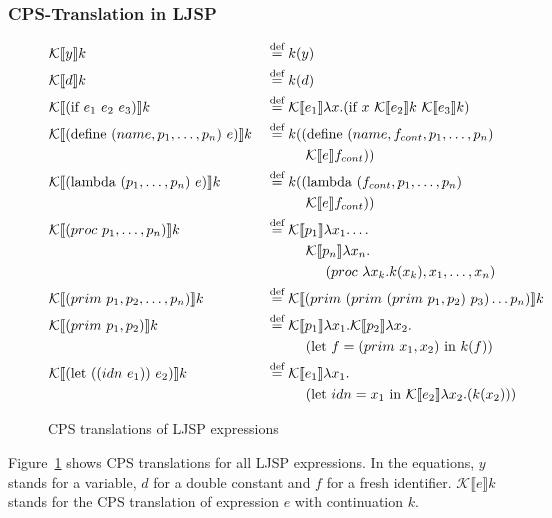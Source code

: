 \documentclass[11pt]{report}
\newcommand{\eqdef}{\stackrel{\text{def}}{=}}%
\newcommand{\cpstrans}[1]{\ensuremath{\mathcal{K}\llbracket #1 \rrbracket}}
\begin{document}
\subsubsection{CPS-Translation in LJSP}
\begin{figure}[ht]
\begin{alignat*}{2}
&\cpstrans{y} k &&\eqdef k(y) \\
%
&\cpstrans{d} k &&\eqdef k(d) \\
%
&\cpstrans{(\text{if}\ e_1\ e_2\ e_3)} k &&\eqdef \cpstrans{e_1} \lambda x.(\text{if}\ x\ \cpstrans{e_2}k\ \cpstrans{e_3}k) \\
%
&\cpstrans{(\text{define}\ (name, p_1, \dots, p_n)\ e)} k &&\eqdef k((\text{define}\ (name, f_{cont}, p_1, \dots, p_n)\ \\
&&&\hspace{1cm}\cpstrans{e}f_{cont})) \\
%
&\cpstrans{(\text{lambda}\ (p_1, \dots, p_n)\ e)} k &&\eqdef k((\text{lambda}\ (f_{cont}, p_1, \dots, p_n)\ \\
&&&\hspace{1cm}\cpstrans{e}f_{cont})) \\
%
&\cpstrans{(proc\ p_1, \dots, p_n)} k &&\eqdef \cpstrans{p_1} \lambda x_1. \dots  \\
&&&\hspace{1 cm}\cpstrans{p_n} \lambda x_n.\\
&&&\hspace{1.5 cm}(proc\ \lambda x_k.k(x_k), x_1, \dots, x_n) \\
%
&\cpstrans{(prim\ p_1, p_2, \dots, p_n)} k &&\eqdef \cpstrans{(prim\ (prim\ (prim\ p_1, p_2)\ p_3) \dots p_n)} k\\
%
&\cpstrans{(prim\ p_1, p_2)} k &&\eqdef \cpstrans{p_1}\lambda x_1. \cpstrans{p_2}\lambda x_2.\\
&&&\hspace{1cm}(\text{let}\ f=(prim\ x_1, x_2)\ \text{in}\ k(f))\\
%
&\cpstrans{(\text{let}\ ((idn\ e_1))\ e_2)} k &&\eqdef \cpstrans{e_1} \lambda x_1. \\
&&&\hspace{1 cm}(\text{let}\ idn = x_1\ \text{in}\ \cpstrans{e_2} \lambda x_2.(k(x_2)))\\
\end{alignat*}
\caption{CPS translations of LJSP expressions}
\label{cpstrans}
\end{figure}

Figure~\ref{cpstrans} shows CPS translations for all LJSP expressions. In the equations, $y$ stands for a variable, $d$ for a double constant and $f$ for a fresh identifier. $\cpstrans{e} k$ stands for the CPS translation of expression $e$ with continuation $k$.
\end{document}

